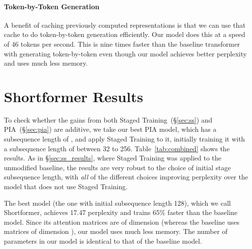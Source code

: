\documentclass[11pt,a4paper]{article}
\begin{document}
\paragraph{Token-by-Token Generation}


A benefit of caching previously computed representations is that we can use that cache to do token-by-token generation efficiently. 
Our model does this at a speed of 46 tokens per second. 
This is nine times faster than the baseline transformer with  generating token-by-token even though our model achieves better perplexity and uses much less memory. 





 
\section{Shortformer Results}
\label{sec:combined}

To check whether the gains from both Staged Training~(\S\ref{sec:ss}) and PIA~(\S\ref{sec:pia}) are additive, we take our best PIA model, which has a subsequence length  of , and apply Staged Training to it, initially training it with a subsequence length of between 32 to 256. Table~\ref{tab:combined} shows the results. As in \S\ref{sec:ss_results}, where Staged Training was applied to the unmodified baseline, the results are very robust to the choice of initial stage subsequence length, with \emph{all} of the different choices improving perplexity over the model that does not use Staged Training. 

The best model (the one with initial subsequence length 128), which we call Shortformer, achieves 17.47 perplexity and trains 65\% faster than the baseline model. Since its attention matrices are of dimension  (whereas the baseline uses matrices of dimension ), our model uses much less memory. The number of parameters in our model is identical to that of the baseline model. 
\end{document}

